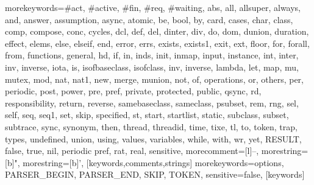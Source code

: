   {morekeywords={\#act, \#active, \#fin, \#req, \#waiting, abs, all, allsuper, always, and, answer, 
     assumption, async, atomic, be, bool, by, card, cases, char, class, comp, compose, conc, cycles,
     dcl, def, del, dinter, div, do, dom, dunion, duration, effect, elems, else, elseif, end,
     error, errs, exists, exists1, exit, ext, floor, for, forall, from, functions, 
     general, hd, if, in, inds, init, inmap, input, instance, int, inter, inv, inverse, iota, is, 
     isofbaseclass, isofclass, inv, inverse, lambda, let, map, mu, mutex, mod, nat, nat1, new, merge, 
     munion, not, of, operations, or, others, per, periodic, post, power, pre, pref, 
     private, protected, public, qsync, rd, responsibility, return, reverse, samebaseclass, 
     sameclass, psubset, rem, rng, sel, self, seq, seq1, set, skip, specified, st, 
     start, startlist, static, subclass, subset, subtrace, sync, synonym, then, thread, 
     threadid, time, tixe, tl, to, token, trap, types, undefined, union, using, values, 
     variables, while, with, wr, yet, RESULT, false, true, nil, periodic pref, rat, real},
   sensitive,
   morecomment=[l]--,
   morestring=[b]",
   morestring=[b]',
  }[keywords,comments,strings]
  {morekeywords={options, PARSER\_BEGIN, PARSER\_END, SKIP, TOKEN},
   sensitive=false,
  }[keywords]
